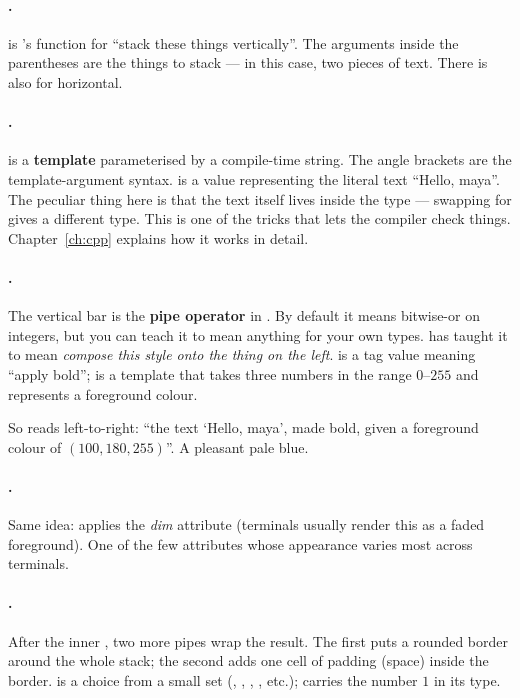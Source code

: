 \paragraph{.}
 is \maya{}'s function for ``stack these things vertically''.
The arguments inside the parentheses are the things to stack ---
in this case, two pieces of text. There is also  for
horizontal.

\paragraph{.}
 is a \textbf{template} parameterised by a compile-time
string. The angle brackets \code{<\ldots>} are the template-argument
syntax.  is a value representing the literal
text ``Hello, maya''. The peculiar thing here is that the text itself
lives inside the type --- swapping  for 
gives a different type. This is one of the tricks that lets the
compiler check things. Chapter~\ref{ch:cpp} explains how it works in
detail.

\paragraph{.}
The vertical bar \code{|} is the \textbf{pipe operator} in \cpp{}. By
default it means bitwise-or on integers, but you can teach it to mean
anything for your own types. \maya{} has taught it to mean
\emph{compose this style onto the thing on the left}.  is
a tag value meaning ``apply bold'';  is a template
that takes three numbers in the range $0$--$255$ and represents a
foreground colour.

So  reads
left-to-right: ``the text `Hello, maya', made bold, given a foreground
colour of $(100, 180, 255)$''. A pleasant pale blue.

\paragraph{.}
Same idea: applies the \emph{dim} attribute (terminals usually render
this as a faded foreground). One of the few attributes whose
appearance varies most across terminals.

\paragraph{.}
After the inner , two more pipes wrap the result. The
first puts a rounded border around the whole stack; the second adds
one cell of padding (space) inside the border.  is a
choice from a small set (, , ,
, etc.);  carries the number $1$ in its type.

